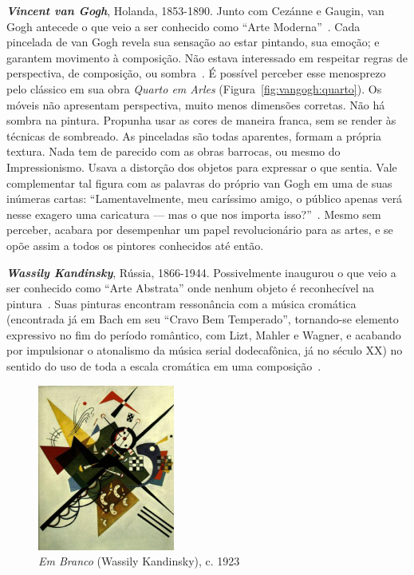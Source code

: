 \textbf{\emph{Vincent van Gogh}}, Holanda, 1853-1890. Junto com
Cezánne e Gaugin, van Gogh antecede o que veio a ser conhecido como
``Arte Moderna''~\cite{gombrich}. Cada pincelada de van Gogh revela
sua sensação ao estar pintando, sua emoção; e garantem movimento à
composição. Não estava interessado em respeitar regras de perspectiva,
de composição, ou sombra~\cite{hulsker}. É possível perceber esse
menosprezo pelo clássico em sua obra \textit{Quarto em Arles}
(Figura~\ref{fig:vangogh:quarto}). Os móveis não apresentam
perspectiva, muito menos dimensões corretas. Não há sombra na
pintura. Propunha usar as cores de maneira franca, sem se render às
técnicas de sombreado. As pinceladas são todas aparentes, formam a
própria textura. Nada tem de parecido com as obras barrocas, ou mesmo
do Impressionismo. Usava a distorção dos objetos para expressar o que
sentia. Vale complementar tal figura com as palavras do próprio van
Gogh em uma de suas inúmeras cartas: ``Lamentavelmente, meu caríssimo
amigo, o público apenas verá nesse exagero uma caricatura --- mas o
que nos importa isso?''~\cite{van1958}. Mesmo sem perceber, acabara
por desempenhar um papel revolucionário para as artes, e se opõe assim
a todos os pintores conhecidos até então.

\textbf{\emph{Wassily Kandinsky}}, Rússia, 1866-1944. Possivelmente
inaugurou o que veio a ser conhecido como ``Arte Abstrata'' onde
nenhum objeto é reconhecível na pintura~\cite{duchting}. Suas pinturas
encontram ressonância com a música cromática (encontrada já em Bach em
seu ``Cravo Bem Temperado'', tornando-se elemento expressivo no fim do
período romântico, com Lizt, Mahler e Wagner, e acabando por
impulsionar o atonalismo da música serial dodecafônica, já no século
XX) no sentido do uso de toda a escala cromática em uma
composição~\cite{gombrich}. 

\begin{figure}
  \begin{center}
    \includegraphics[width=0.4\textwidth]{figs/kandinsky_white.png}
  \end{center}
  \caption{\emph{Em Branco} (Wassily Kandinsky), c. 1923}
  \label{fig:kandinsky:white}
\end{figure}

